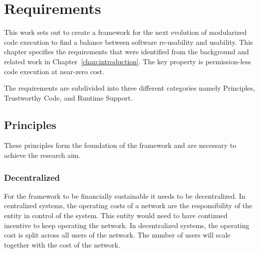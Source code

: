 \chapter{\label{chap:requirements}Requirements}



%

This work sets out to create a framework for the next evolution of modularized code execution to find a balance between software re-usability and usability. This chapter specifies the requirements that were identified from the background and related work in Chapter~\ref{chap:introduction}. The key property is permission-less code execution at near-zero cost.



The requirements are subdivided into three different categories namely Principles, Trustworthy Code, and Runtime Support.

\section{Principles}

These principles form the foundation of the framework and are necessary to achieve the research aim.

\subsection*{Decentralized}

For the framework to be financially sustainable it needs to be decentralized. In centralized systems, the operating costs of a network are the responsibility of the entity in control of the system. This entity would need to have continued incentive to keep operating the network. In decentralized systems, the operating cost is split across all users of the network. The number of users will scale together with the cost of the network.

